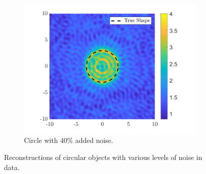 \documentclass[]{article}
\begin{document}
\begin{figure}[h]
\begin{subfigure}{.3\textwidth}
						\centering
						\includegraphics[width = \textwidth]{Numeric Simulations/Images/circle-40-noise-reconstructed}
						\caption{Circle with 40\% added noise.}
					\end{subfigure}
					\caption{Reconstructions of circular objects with various levels of noise in data.}
					\label{fig:circlenoise}
				\end{figure} 
\end{document}
